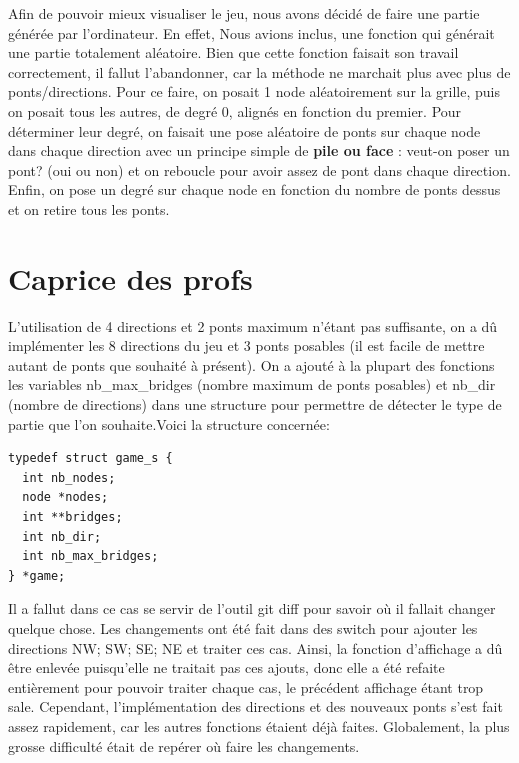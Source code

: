 \documentclass[12pt]{report}
\begin{document}
Afin de pouvoir mieux visualiser le jeu, nous avons décidé de faire une partie générée par l'ordinateur.
En effet, Nous avions inclus, une fonction qui générait une partie totalement aléatoire. Bien que cette fonction faisait son travail correctement, il fallut l'abandonner, car la méthode ne marchait plus avec plus de ponts/directions. Pour ce faire, on posait 1 node aléatoirement sur la grille, puis on posait tous les autres, de degré 0, alignés en fonction du premier. Pour déterminer leur degré, on faisait une pose aléatoire de ponts sur chaque node dans chaque direction avec un principe simple de \textbf{pile ou face} : veut-on poser un pont? (oui ou non) et on reboucle pour avoir assez de pont dans chaque direction. Enfin, on pose un degré sur chaque node en fonction du nombre de ponts dessus et on retire tous les ponts.

\chapter{Caprice des profs}
L'utilisation de 4 directions et 2 ponts maximum n'étant pas suffisante, on a dû implémenter les 8 directions du jeu et 3 ponts posables (il est facile de mettre autant de ponts que souhaité à présent).
On a ajouté à la plupart des fonctions les variables nb\_max\_bridges (nombre maximum de ponts posables) et nb\_dir (nombre de directions) dans une structure pour permettre de détecter le type de partie que l'on souhaite.Voici la structure concernée:
\begin{verbatim}
typedef struct game_s {
  int nb_nodes;
  node *nodes;
  int **bridges;
  int nb_dir;
  int nb_max_bridges;
} *game;
\end{verbatim}
Il a fallut dans ce cas se servir de l'outil git diff pour savoir où il fallait changer quelque chose. Les changements ont été fait dans des switch pour ajouter les directions NW; SW; SE; NE et traiter ces cas. Ainsi, la fonction d'affichage a dû être enlevée puisqu'elle ne traitait pas ces ajouts, donc elle a été refaite entièrement pour pouvoir traiter chaque cas, le précédent affichage étant trop sale. Cependant, l'implémentation des directions et des nouveaux ponts s'est fait assez rapidement, car les autres fonctions étaient déjà faites. Globalement, la plus grosse difficulté était de repérer où faire les changements.
\end{document}
